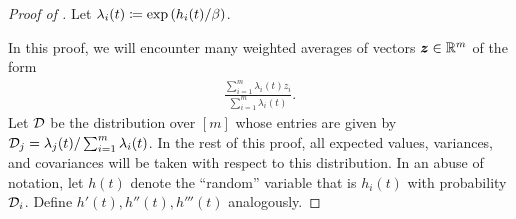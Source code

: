 \begin{proof}[Proof of ]
Let $\lambda_i(t) \coloneqq \mathrm{exp}\left(h_i(t)/\beta\right)$.

In this proof, we will encounter many weighted averages of vectors $\bm{z} \in \mathbb{R}^m$ of the form
\begin{align*}
    \frac{\sum_{i=1}^m \lambda_i(t)z_i}{\sum_{i=1}^m \lambda_i(t)}.
\end{align*}
Let $\mathcal{D}$ be the distribution over $[m]$ whose entries are given by $\mathcal{D}_j = \lambda_j(t)/\sum_{i=1}^m \lambda_i(t)$. In the rest of this proof, all expected values, variances, and covariances will be taken with respect to this distribution. In an abuse of notation, let $h(t)$ denote the ``random'' variable that is $h_i(t)$ with probability $\mathcal{D}_i$. Define $h'(t), h''(t), h'''(t)$ analogously.


\end{proof}
